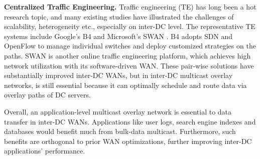 \textbf{Centralized Traffic Engineering.} Traffic engineering (TE) has long been a hot research topic, and many existing studies \cite{chen2012design, kavulya2010analysis, mishra2010towards, reiss2012heterogeneity, sharma2011modeling, More, zhang2011characterizing} have illustrated the challenges of scalability, heterogeneity etc., especially on inter-DC level. The representative TE systems include Google's B4 \cite{jain2013b4} and Microsoft's SWAN \cite{hong2013achieving}. B4 adopts SDN \cite{mckeown2009software} and OpenFlow \cite{OpenFlow,mckeown2008openflow} to manage individual switches and deploy customized strategies on the paths. SWAN is another online traffic engineering platform, which achieves high network utilization with its software-driven WAN. These pair-wise solutions have substantially improved inter-DC WANs, but in inter-DC multicast overlay networks, \name is still essential because it can optimally schedule and route data via overlay paths of DC servers.

Overall, an application-level multicast overlay network is essential to data transfer in inter-DC WANs. Applications like user logs, search engine indexes and databases would benefit much from bulk-data multicast. Furthermore, such benefits are orthogonal to prior WAN optimizations, further improving inter-DC applications' performance.

